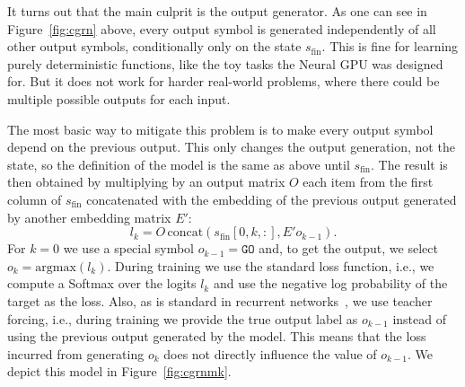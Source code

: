 \documentclass{article}
\newcommand\argmax{\mathrm{argmax}}
\newcommand\sfin{s_\mathrm{fin}}
\begin{document}
It turns out that the main culprit is the output generator.
As one can see in Figure~\ref{fig:cgrn} above, every output
symbol is generated independently of all other output symbols,
conditionally only on the state $\sfin$.
This is fine for learning purely deterministic functions,
like the toy tasks the Neural GPU was designed for. But it does
not work for harder real-world problems, where there could be multiple
possible outputs for each input.

The most basic way to mitigate this problem is to make every
output symbol depend on the previous output. This only changes
the output generation, not the state, so the definition of the
model is the same as above until $\sfin$. The result is then
obtained by multiplying by an output matrix $O$ each item from
the first column of $\sfin$ concatenated with the embedding of
the previous output generated by another embedding matrix $E'$:
\[ l_k = O \, \textrm{concat}(\sfin[0,k,:], E' o_{k-1}).\]
For $k=0$ we use a special symbol $o_{k-1} = \texttt{GO}$ and,
to get the output, we select $o_k = \argmax(l_k)$.
During training we use the standard loss function, i.e.,
we compute a Softmax over the logits $l_k$ and
use the negative log probability of the target as the loss.
Also, as is standard in recurrent networks~\cite{sutskever14}, we use
teacher forcing, i.e., during training we provide the true output
label as $o_{k-1}$ instead of using the previous output generated
by the model. This means that the loss incurred from generating $o_{k}$ does not directly influence the value of $o_{k-1}$.
We depict this model in Figure~\ref{fig:cgrnmk}.
\end{document}
